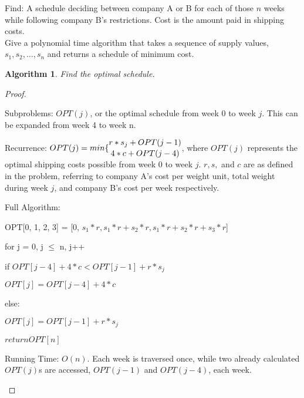 \documentclass[11pt, oneside]{article}   	%
\newtheorem{Algorithm}{Algorithm}
\begin{document}
\noindent Find: A schedule deciding between company A or B for each of those $n$ weeks while following company B's restrictions. Cost is the amount paid in shipping costs. \\

\noindent Give a polynomial time algorithm that takes a sequence of supply values, $s_1, s_2, \ldots , s_n$ and returns a schedule of minimum cost.

\begin{Algorithm}
Find the optimal schedule.
\end{Algorithm}

\begin{proof}
\begin{description}

Subproblems: $OPT(j)$, or the optimal schedule from week 0 to week $j$. This can be expanded from week 4 to week n.

Recurrence: $OPT(j) = min \{\stackanchor{$r * s_j + OPT(j-1)$}{$4 * c + OPT(j-4)$}$, where $OPT(j)$ represents the optimal shipping costs possible from week 0 to week $j$. $r, s,$ and $c$ are as defined in the problem, referring to company A's cost per weight unit, total weight during week $j$, and company B's cost per week respectively.

Full Algorithm: 

OPT[0, 1, 2, 3] = [0, $s_1 * r, s_1*r + s_2 * r, s_1*r + s_2*r + s_3*r$]

for j = 0, j $\leq$ n, j++

	\quad if $OPT[j - 4] + 4*c < OPT[j-1] + r*s_j$

	\quad \quad 	$OPT[j] = OPT[j-4] + 4 * c$

	\quad else:

	\quad \quad  $OPT[j] = OPT[j-1] + r*s_j$

$return OPT[n]$

Running Time: $O(n)$. Each week is traversed once, while two already calculated $OPT(j)$s are accessed, $OPT(j-1)$ and $OPT(j-4)$, each week.

\end{description}
\end{proof}
\end{document}
